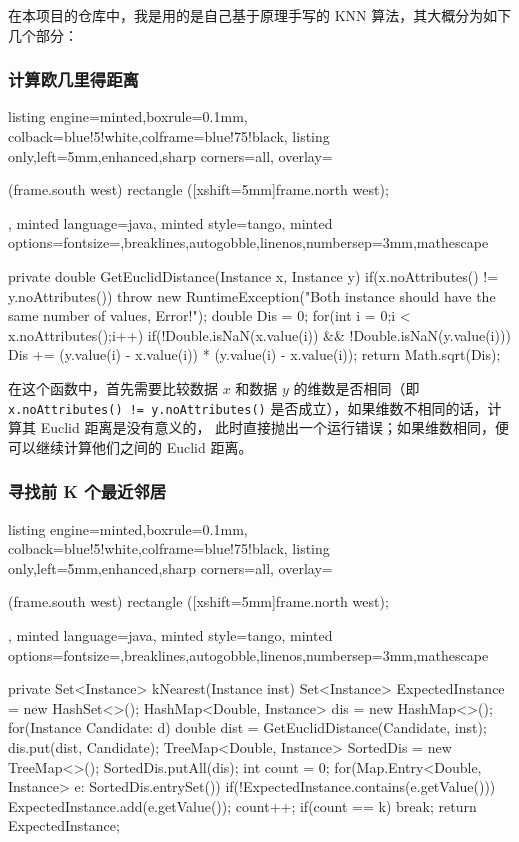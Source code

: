 \documentclass[a4paper, 11pt, cn]{elegantpaper}
\begin{document}
在本项目的仓库中，我是用的是自己基于原理手写的 KNN 算法，其大概分为如下几个部分：

\subsubsection{计算欧几里得距离}
\begin{tcblisting}{listing engine=minted,boxrule=0.1mm,
    colback=blue!5!white,colframe=blue!75!black,
    listing only,left=5mm,enhanced,sharp corners=all,
    overlay={\begin{tcbclipinterior} (frame.south west)
    rectangle ([xshift=5mm]frame.north west);\end{tcbclipinterior}},
    minted language=java,
    minted style=tango,
    minted options={fontsize=\small,breaklines,autogobble,linenos,numbersep=3mm,mathescape}}
private double GetEuclidDistance(Instance x, Instance y)
{
	if(x.noAttributes() != y.noAttributes())
		throw new RuntimeException("Both instance should have the same number of values, Error!");
	double Dis = 0;
	for(int i = 0;i < x.noAttributes();i++)
	{
		if(!Double.isNaN(x.value(i)) && !Double.isNaN(y.value(i)))
				Dis += (y.value(i) - x.value(i)) * (y.value(i) - x.value(i));
	}
	return Math.sqrt(Dis);		
}
\end{tcblisting}

在这个函数中，首先需要比较数据 $x$ 和数据 $y$ 的维数是否相同（即 \texttt{x.noAttributes() != y.noAttributes()} 是否成立），如果维数不相同的话，计算其 Euclid 距离是没有意义的，
此时直接抛出一个运行错误；如果维数相同，便可以继续计算他们之间的 Euclid 距离。

\subsubsection{寻找前 K 个最近邻居}
\begin{tcblisting}{listing engine=minted,boxrule=0.1mm,
    colback=blue!5!white,colframe=blue!75!black,
    listing only,left=5mm,enhanced,sharp corners=all,
    overlay={\begin{tcbclipinterior} (frame.south west)
    rectangle ([xshift=5mm]frame.north west);\end{tcbclipinterior}},
    minted language=java,
    minted style=tango,
    minted options={fontsize=\small,breaklines,autogobble,linenos,numbersep=3mm,mathescape}}
private Set<Instance> kNearest(Instance inst)
{
	Set<Instance> ExpectedInstance = new HashSet<>();
	HashMap<Double, Instance> dis = new HashMap<>();
	for(Instance Candidate: d)
	{
		double dist = GetEuclidDistance(Candidate, inst);
		dis.put(dist, Candidate);
	}
	TreeMap<Double, Instance> SortedDis = new TreeMap<>();
	SortedDis.putAll(dis);
	int count = 0;
	for(Map.Entry<Double, Instance> e: SortedDis.entrySet())
	{
		if(!ExpectedInstance.contains(e.getValue()))
		{
			ExpectedInstance.add(e.getValue());
			count++;
			if(count == k)
				break;
		}
	}
	return ExpectedInstance;
}
\end{tcblisting}
\end{document}
